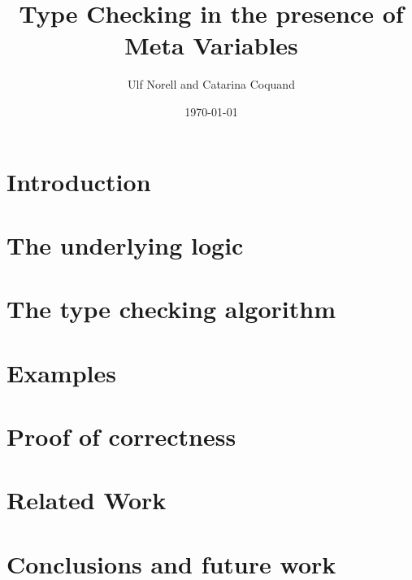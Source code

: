 \documentclass[11pt]{llncs}
\title{Type Checking in the presence of Meta Variables}
\author{Ulf Norell and Catarina Coquand}
\institute{Chalmers University of Technology}
\date{\today}
\begin{document}
\maketitle



\section{Introduction} 

\section{The underlying logic \Core} 

\section{The type checking algorithm} \label{secRules} 

\section{Examples} 

\section{Proof of correctness} \label{secProof} 

\section{Related Work} 

\section{Conclusions and future work} 



\end{document}
